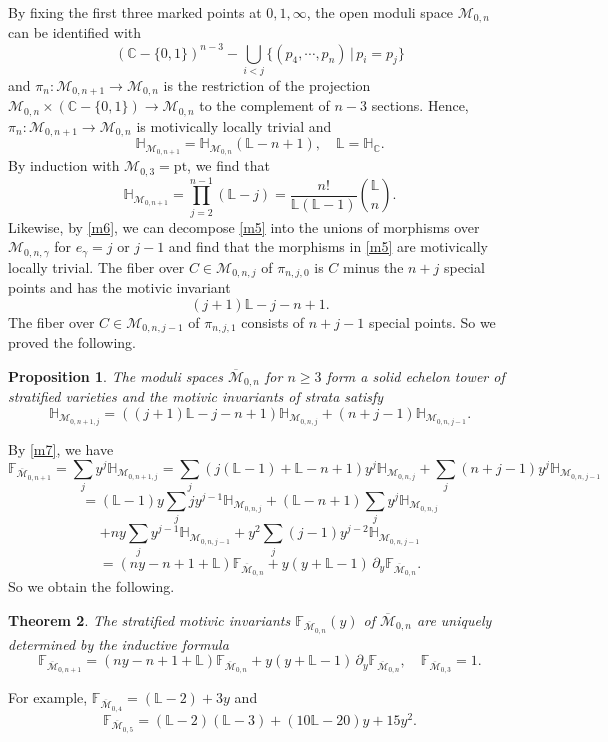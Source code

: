 \documentclass[11pt]{amsart}
\newtheorem{theorem}{Theorem}[section]
\newtheorem{proposition}[theorem]{Proposition}
\newcommand{\Mbarzn}{\overline{\mathcal M}_{0,n}}
\newcommand{\cM}{\mathcal{M}}
\newcommand{\bcM}{\overline{\cM}}
\def\cM{\mathcal{M}}
\def\CC{\mathbb{C}}
\def\LL{\mathbb{L}}
\def\beq{\begin{equation}}
\def\eeq{\end{equation}}
\def\HH{\mathbb{H}}
\def\FF{\mathbb{F}}
\begin{document}
By fixing the first three marked points at $0,1,\infty$, the open moduli space $\cM_{0,n}$ can be identified with 
$$(\CC-\{0,1\})^{n-3}-\bigcup_{i<j}\{(p_4,\cdots,p_n)\,|\,p_i=p_j\}$$
and $\pi_n:\cM_{0,n+1}\to \cM_{0,n}$ is the restriction of the projection $\cM_{0,n}\times (\CC-\{0,1\})\to \cM_{0,n}$ to the complement of $n-3$ sections.  
Hence, $\pi_n:\cM_{0,n+1}\to \cM_{0,n}$ is motivically locally trivial and 
$$\HH_{\cM_{0,n+1}}=\HH_{\cM_{0,n}} (\LL-n+1),\quad \LL=\HH_\CC.$$
By induction with $\cM_{0,3}=\mathrm{pt}$, we find that 
$$\HH_{\cM_{0,n+1}}=\prod_{j=2}^{n-1}(\LL -j)=\frac{n!}{\LL(\LL-1)}\binom{\LL}{n}.$$
Likewise, by \eqref{m6}, we can decompose \eqref{m5} into the unions of morphisms over $\cM_{0,n,\gamma}$ for $e_\gamma=j$ or $j-1$ and find that the morphisms in \eqref{m5} are motivically locally trivial. The fiber over $C\in \cM_{0,n,j}$ of $\pi_{n,j,0}$ is $C$ minus the $n+j$ special points and has the motivic invariant $$(j+1)\LL -j -n+1.$$ 
The fiber over $C\in \cM_{0,n,j-1}$ of $\pi_{n,j,1}$ consists of $n+j-1$ special points. 
So we proved the following.
\begin{proposition}\label{m15} The moduli spaces $\bcM_{0,n}$ for $n\ge 3$ form a solid echelon tower of stratified varieties and the motivic invariants of strata satisfy  
\beq\label{m7}
\HH_{\cM_{0,n+1,j}}=\left((j+1)\LL -j -n+1\right) \HH_{\cM_{0,n,j}} + (n+j-1)\HH_{\cM_{0,n,j-1}}.
\eeq
\end{proposition}

By \eqref{m7}, we have  
$$\FF_{\bcM_{0,n+1}}=\sum_j y^{j}\HH_{\cM_{0,n+1,j}}=\sum_j(j(\LL-1)+\LL -n+1)y^{j}\HH_{\cM_{0,n,j}}
+\sum_j (n+j-1)y^j\HH_{\cM_{0,n,j-1}}$$
$$=(\LL-1)y\sum_jjy^{j-1}\HH_{\cM_{0,n,j}}+(\LL -n+1)\sum_jy^j\HH_{\cM_{0,n,j}}$$ 
$$+ny\sum_jy^{j-1}\HH_{\cM_{0,n,j-1}}+y^2\sum_j (j-1)y^{j-2}\HH_{\cM_{0,n,j-1}}$$
\[
=(ny-n+1+\LL)\FF_{\Mbarzn}+y(y+\LL-1)\,\partial_y\FF_{\Mbarzn}.\]
So we obtain the following.
\begin{theorem}\label{m14}
    The stratified motivic invariants $\FF_{\Mbarzn}(y)$ of $\Mbarzn$ are uniquely determined by the inductive formula
    \beq\label{m11} \FF_{\bcM_{0,n+1}} = (ny-n+1+\LL)\FF_{\Mbarzn}+y(y+\LL-1)\,\partial_y\FF_{\Mbarzn}, \quad \FF_{\bcM_{0,3}}=1.\eeq
\end{theorem}
For example, $\FF_{\bcM_{0,4}}=(\LL-2)+3y$ and 
$$\FF_{\bcM_{0,5}}=(\LL-2)(\LL-3)+(10\LL-20)y+15y^2.$$
\end{document}
